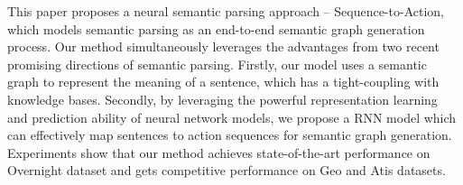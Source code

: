 This paper proposes a neural semantic parsing approach -- Sequence-to-Action, which models semantic parsing as an end-to-end semantic graph generation process. Our method simultaneously leverages the advantages from two recent promising directions of semantic parsing. Firstly, our model uses a semantic graph to represent the meaning of a sentence, which has a tight-coupling with knowledge bases. Secondly, by leveraging the powerful representation learning and prediction ability of neural network models, we propose a RNN model which can effectively map sentences to action sequences for semantic graph generation. Experiments show that our method achieves state-of-the-art performance on Overnight dataset and gets competitive performance on Geo and Atis datasets.
